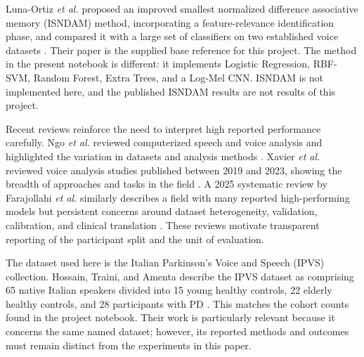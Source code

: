 \documentclass[11pt,a4paper]{article}
\begin{document}
Luna-Ortiz \emph{et al.} proposed an improved smallest normalized difference associative memory (ISNDAM) method, incorporating a feature-relevance identification phase, and compared it with a large set of classifiers on two established voice datasets \cite{luna2023}. Their paper is the supplied base reference for this project. The method in the present notebook is different: it implements Logistic Regression, RBF-SVM, Random Forest, Extra Trees, and a Log-Mel CNN. ISNDAM is not implemented here, and the published ISNDAM results are not results of this project.

Recent reviews reinforce the need to interpret high reported performance carefully. Ngo \emph{et al.} reviewed computerized speech and voice analysis and highlighted the variation in datasets and analysis methods \cite{ngo2022}. Xavier \emph{et al.} reviewed voice analysis studies published between 2019 and 2023, showing the breadth of approaches and tasks in the field \cite{xavier2025}. A 2025 systematic review by Farajollahi \emph{et al.} similarly describes a field with many reported high-performing models but persistent concerns around dataset heterogeneity, validation, calibration, and clinical translation \cite{farajollahi2025}. These reviews motivate transparent reporting of the participant split and the unit of evaluation.

The dataset used here is the Italian Parkinson's Voice and Speech (IPVS) collection. Hossain, Traini, and Amenta describe the IPVS dataset as comprising 65 native Italian speakers divided into 15 young healthy controls, 22 elderly healthy controls, and 28 participants with PD \cite{hossain2026}. This matches the cohort counts found in the project notebook. Their work is particularly relevant because it concerns the same named dataset; however, its reported methods and outcomes must remain distinct from the experiments in this paper.
\end{document}
